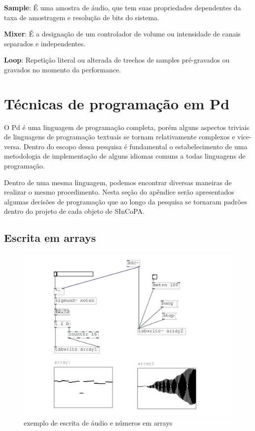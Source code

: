 \documentclass{ppgmus}
\begin{document}
\textbf{Sample}: É uma amostra de áudio, que tem suas propriedades dependentes da
taxa de amostragem e resolução de bits do sistema.


\textbf{Mixer}: É a designação de um controlador de volume ou intensidade de canais separados 
e independentes.

\textbf{Loop}: Repetição literal ou alterada de trechos de samples pré-gravados ou
gravados no momento da performance.

\section{Técnicas de programação em Pd}
\label{tecnicas}


O Pd é uma linguagem de programação completa, porém alguns aspectos triviais
de linguagens de programação textuais se tornam relativamente complexos e vice-versa.
Dentro do escopo dessa pesquisa é fundamental o estabelecimento de uma metodologia de
implementação de alguns idiomas comuns a todas linguagens de programação.

Dentro de uma mesma linguagem, podemos encontrar diversas maneiras
de realizar o mesmo procedimento. Nesta seção do apêndice serão apresentados algumas decisões de programação 
que ao longo da pesquisa se tornaram padrões dentro do projeto de cada
objeto de SInCoPA.
 
\subsection{Escrita em arrays}

\begin{figure}
\includegraphics[scale=.6]{escrita-array}
\caption{exemplo de escrita de áudio e números em arrays}
\label{escritaarray}
\end{figure}
\end{document}
